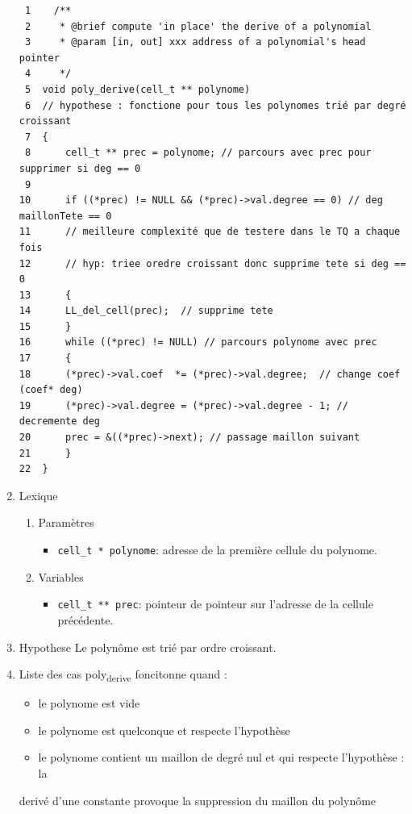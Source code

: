 \documentclass[11pt]{article}
\begin{document}
\begin{enumerate}
\begin{verbatim}
 1    /**
 2     * @brief compute 'in place' the derive of a polynomial 
 3     * @param [in, out] xxx address of a polynomial's head pointer
 4     */
 5  void poly_derive(cell_t ** polynome)
 6  // hypothese : fonctione pour tous les polynomes trié par degré croissant
 7  {
 8      cell_t ** prec = polynome; // parcours avec prec pour supprimer si deg == 0
 9  
10      if ((*prec) != NULL && (*prec)->val.degree == 0) // deg maillonTete == 0
11      // meilleure complexité que de testere dans le TQ a chaque fois
12      // hyp: triee oredre croissant donc supprime tete si deg == 0
13      {
14  	LL_del_cell(prec);  // supprime tete
15      }
16      while ((*prec) != NULL) // parcours polynome avec prec
17      {
18  	(*prec)->val.coef  *= (*prec)->val.degree;  // change coef (coef* deg)
19  	(*prec)->val.degree = (*prec)->val.degree - 1; // decremente deg
20  	prec = &((*prec)->next); // passage maillon suivant
21      }
22  }
\end{verbatim}

\item Lexique
\label{sec:org2f5b7b0}
\begin{enumerate}
\item Paramètres
\label{sec:orgfa8903b}
\begin{itemize}
\item \texttt{cell\_t * polynome}: adresse de la première cellule du polynome.
\end{itemize}
\item Variables
\label{sec:org4916d72}
\begin{itemize}
\item \texttt{cell\_t ** prec}: pointeur de pointeur sur l'adresse de la cellule précédente.
\end{itemize}
\end{enumerate}
\item Hypothese
\label{sec:org7f01fcb}
Le polynôme est trié par ordre croissant.
\item Liste des cas
\label{sec:org5ed3909}
poly\textsubscript{derive} foncitonne quand :
\begin{itemize}
\item le polynome est vide
\item le polynome est quelconque et respecte l'hypothèse
\item le polynome contient un maillon de degré nul et qui respecte l'hypothèse : la
\end{itemize}
derivé d'une constante provoque la suppression du maillon du polynôme
\end{enumerate}
\end{document}
